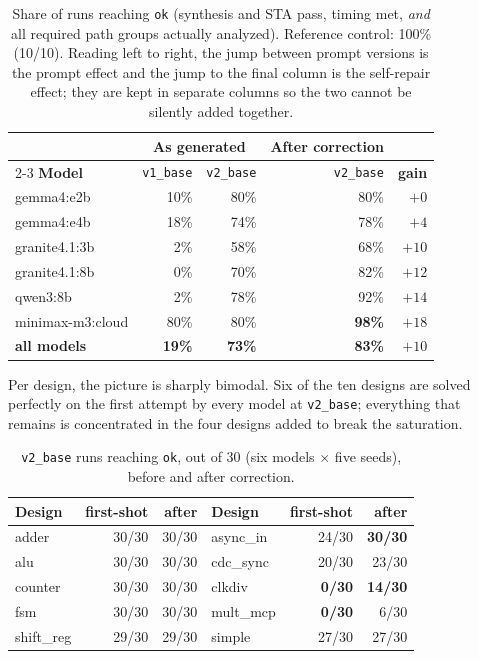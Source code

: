 \documentclass[11pt]{article}
\begin{document}
\begin{table}[h]
\centering
\begin{tabular}{lrrrr}
\toprule
& \multicolumn{2}{c}{\textbf{As generated}} & \textbf{After correction} & \\
\cmidrule(lr){2-3}
\textbf{Model} & \texttt{v1\_base} & \texttt{v2\_base} & \texttt{v2\_base} & \textbf{gain} \\
\midrule
gemma4:e2b       & 10\% & 80\% & 80\% & $+0$ \\
gemma4:e4b       & 18\% & 74\% & 78\% & $+4$ \\
granite4.1:3b    & 2\%  & 58\% & 68\% & $+10$ \\
granite4.1:8b    & 0\%  & 70\% & 82\% & $+12$ \\
qwen3:8b         & 2\%  & 78\% & 92\% & $+14$ \\
minimax-m3:cloud & 80\% & 80\% & \textbf{98\%} & $+18$ \\
\midrule
\textbf{all models} & \textbf{19\%} & \textbf{73\%} & \textbf{83\%} & $+10$ \\
\bottomrule
\end{tabular}
\caption*{\small Share of runs reaching \texttt{ok} (synthesis and STA pass, timing met, \emph{and} all required path groups actually analyzed). Reference control: 100\% (10/10). Reading left to right, the jump between prompt versions is the prompt effect and the jump to the final column is the self-repair effect; they are kept in separate columns so the two cannot be silently added together.}
\end{table}

Per design, the picture is sharply bimodal. Six of the ten designs are solved perfectly on the first attempt by every model at \texttt{v2\_base}; everything that remains is concentrated in the four designs added to break the saturation.

\begin{table}[h]
\centering
\small
\begin{tabular}{lrr@{\qquad}lrr}
\toprule
\textbf{Design} & \textbf{first-shot} & \textbf{after} & \textbf{Design} & \textbf{first-shot} & \textbf{after} \\
\midrule
adder     & 30/30 & 30/30 & async\_in & 24/30 & \textbf{30/30} \\
alu       & 30/30 & 30/30 & cdc\_sync & 20/30 & 23/30 \\
counter   & 30/30 & 30/30 & clkdiv    & \textbf{0/30}  & \textbf{14/30} \\
fsm       & 30/30 & 30/30 & mult\_mcp & \textbf{0/30}  & 6/30 \\
shift\_reg & 29/30 & 29/30 & simple   & 27/30 & 27/30 \\
\bottomrule
\end{tabular}
\caption*{\small \texttt{v2\_base} runs reaching \texttt{ok}, out of 30 (six models $\times$ five seeds), before and after correction.}
\end{table}
\end{document}

